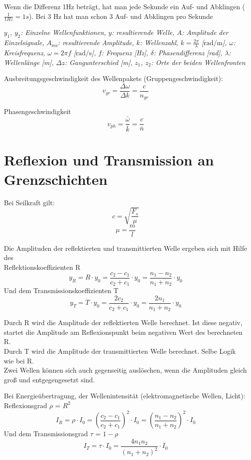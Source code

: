 \documentclass[a4paper,10pt]{article}
\newenvironment{displayformula}
{
	\begin{framed}
		\color{formulaColor}
	}
	{\end{framed}}
\newcommand{\formulalegend}[1]{%
	\par\vspace{0.5ex}%
	{{\color{legendColor}\RaggedRight\small\textit{#1}}}%
	\par\vspace{1.5ex}%
}
\begin{document}
Wenn die Differenz 1Hz beträgt, hat man jede Sekunde ein Auf- und Abklingen ($\frac{1}{1 Hz} = 1s$). Bei 3 Hz hat man schon 3 Auf- und Abklingen pro Sekunde
\formulalegend{
	$y_1$, $y_2$: Einzelne Wellenfunktionen, 
	$y$: resultierende Welle, 
	$A$: Amplitude der Einzelsignale, 
	$A_{\text{res}}$:  resultierende Amplitude, 
	$k$: Wellenzahl, $k = \frac{2\pi}{\lambda}$ [$\text{rad}/\text{m}$], 
	$\omega$: Kreisfrequenz, $\omega = 2\pi f$ [$\text{rad}/\text{s}$], 
	$f$: Frequenz [Hz], 
	$\delta$: Phasendifferenz [rad], 
	$\lambda$: Wellenlänge [m], 
	$\Delta z$: Gangunterschied [m], 
	$z_1$, $z_2$: Orte der beiden Wellenfronten
}

\begin{displayformula}
		Ausbreitungsgeschwindigkeit des Wellenpakets (Gruppengeschwindigkeit):
	\[
	v_{gr} = \frac{\Delta \omega}{\Delta k} = \frac{c}{n_{gr}}
	\]
\end{displayformula}

\begin{displayformula}
		Phasengeschwindigkeit
	\[
	v_{ph} = \frac{\bar{ \omega}}{\bar{k}} = \frac{c}{\bar{n}}
	\]
\end{displayformula}

\section{Reflexion und Transmission an Grenzschichten}

\begin{displayformula}
Bei Seilkraft gilt: 
	\[
	c = \sqrt{\frac{F_s}{\mu}}
	\]
	\[
	\mu = \frac{m}{l}
	\]
\end{displayformula}

\begin{displayformula}
	Die Amplituden der reflektierten und transmittierten Welle ergeben sich mit Hilfe des \\ Reflektionskoeffizienten R
	\[
	y_R = R \cdot y_0 = \frac{c_2 - c_1}{c_2 + c_1} \cdot y_0 = \frac{n_1 - n_2}{n_1 + n_2} \cdot y_0
	\]
	Und dem Transmissionskoeffizienten T
	\[
	y_T = T \cdot y_0 = \frac{2c_2}{c_2 + c_1} \cdot y_0 = \frac{2n_1}{n_1 + n_2} \cdot y_0
	\]
\end{displayformula}
Durch R wird die Amplitude der reflektierten Welle berechnet. Ist diese negativ, startet die Amplitude am Reflexionspunkt beim negativen Wert des berechneten R. \\
Durch T wird die Amplitude der transmittierten Welle berechnet. Selbe Logik wie bei R. \\
Zwei Wellen können sich auch gegenseitig auslöschen, wenn die Amplituden gleich groß und entgegengesetzt sind.

\begin{displayformula}
	Bei Energieübertragung, der Wellenintensität (elektromagnetische Wellen, Licht): \\
	Reflexionsgrad $\rho$ = $R^2$
	\[
	I_R = \rho \cdot I_0 = (\frac{c_2 - c_1}{c_2 + c_1})^2 \cdot I_0 = (\frac{n_1 - n_2}{n_1 + n_2})^2 \cdot I_0
	\]
	Und dem Transmissionsgrad $\tau$ =  $1 - \rho$
	\[
	I_T = \tau \cdot I_0 = \frac{4n_1n_2}{(n_1 + n_2)^2} \cdot I_0
	\]
\end{displayformula}
\end{document}
